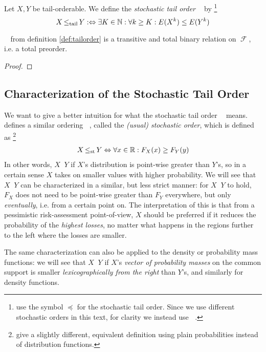\documentclass[a4paper]{scrreprt}
\DeclareMathOperator{\leqst}{\leq_{\text{st}}}
\DeclareMathOperator{\leqtail}{\leq_{\text{tail}}}
\DeclareMathOperator{\F}{\mathcal{F}}
\begin{document}
    \begin{defn}
        Let $X, Y$ be tail-orderable. We define the \emph{stochastic tail order} $\leqtail$ by
        \footnote{\cite{bib:rassTotalOrderingOnLossDistributions,bib:rassGameRiskManagI} use the symbol $\preceq$ for the stochastic tail order. Since we use different stochastic orders in this text, for clarity we instead use $\leqtail$.}
        \[ X \leqtail Y :\lra \exists K \in \N: \forall k \geq K: E(X^k) \leq E(Y^k)\]
        \label{def:tailorder}
    \end{defn}
    
    \begin{lemma}
        $\leqtail$ from definition \ref{def:tailorder} is a transitive and total binary relation on $\F$, i.e. a total preorder.
    \end{lemma}
    \begin{proof}
    \end{proof}
    
    \subsection{Characterization of the Stochastic Tail Order}
    We want to give a better intuition for what the stochastic tail order $\leqtail$ means.
    \cite{bib:shakedStochasticOrders} defines a similar ordering $\leqst$, called the \emph{(usual) stochastic order}, which is defined as
    \footnote{\cite{bib:shakedStochasticOrders} give a slightly different, equivalent definition using plain probabilities instead of distribution functions.}
    \begin{gather}
        X \leqst Y \lra \forall x \in \R: F_X(x) \geq F_Y(y)
    \end{gather}
    In other words, $X \leqst Y$ if $X$'s distribution is point-wise greater than $Y$'s, so in a certain sense $X$ takes on smaller values with higher probability.
    We will see that $X \leqtail Y$ can be characterized in a similar, but less strict manner: for $X \leqst Y$ to hold, $F_X$ does not need to be point-wise greater than $F_Y$ everywhere, but only \emph{eventually}, i.e. from a certain point on. The interpretation of this is that from a pessimistic risk-assessment point-of-view, $X$ should be preferred if it reduces the probability of the \emph{highest losses}, no matter what happens in the regions further to the left where the losses are smaller.
    
    The same characterization can also be applied to the density or probability mass functions: we will see that $X \leqtail Y$ if $X$'s \emph{vector of probability masses} on the common support is smaller \emph{lexicographically from the right} than $Y$'s, and similarly for density functions.
    
\end{document}
